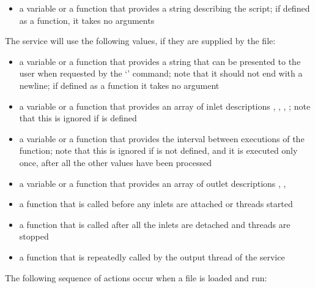 \begin{itemize}
\item\textbf{} \longDash{} a variable or a function that
provides a string describing the script; if defined as a function, it takes no arguments
\end{itemize}
\secondaryEnd
{}
The \CLF{} service will use the following values, if they are supplied by the \CL{} file:
\begin{itemize}
\item\textbf{} \longDash{} a variable or a function that provides a
string that can be presented to the user when requested by the `' command; note
that it should not end with a newline; if defined as a function it takes no argument
\item\exSp\textbf{} \longDash{} a variable or a function that
provides an array of inlet descriptions \openSq{}, ,
, \closeSq; note that this is ignored if
 is defined
\item\exSp\textbf{} \longDash{} a variable or a function that
provides the interval between executions of the  function; note that
this is ignored if  is not defined, and it is executed only once,
after all the other values have been processed
\item\exSp\textbf{} \longDash{} a variable or a function that
provides an array of outlet descriptions \openSq{}, ,
\closeSq
\item\exSp\textbf{} \longDash{} a function that is called before
any inlets are attached or threads started
\item\exSp\textbf{} \longDash{} a function that is called after all
the inlets are detached and threads are stopped
\item\exSp\textbf{} \longDash{} a function that is repeatedly
called by the output thread of the service
\end{itemize}
\secondaryEnd
\condPage
{}
The following sequence of actions occur when a \CL{} file is loaded and run:
